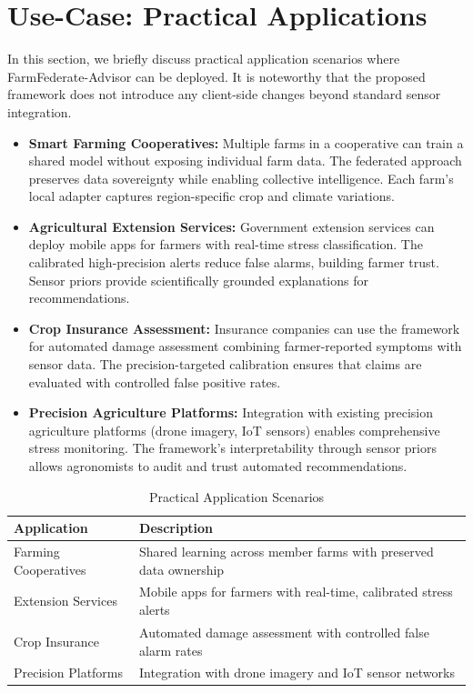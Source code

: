 \documentclass[10pt,journal,compsoc]{IEEEtran}
\begin{document}
\section{Use-Case: Practical Applications}
\label{sec:usecase}

In this section, we briefly discuss practical application scenarios where FarmFederate-Advisor can be deployed. It is noteworthy that the proposed framework does not introduce any client-side changes beyond standard sensor integration.

\begin{itemize}
    \item \textbf{Smart Farming Cooperatives:} Multiple farms in a cooperative can train a shared model without exposing individual farm data. The federated approach preserves data sovereignty while enabling collective intelligence. Each farm's local adapter captures region-specific crop and climate variations.

    \item \textbf{Agricultural Extension Services:} Government extension services can deploy mobile apps for farmers with real-time stress classification. The calibrated high-precision alerts reduce false alarms, building farmer trust. Sensor priors provide scientifically grounded explanations for recommendations.

    \item \textbf{Crop Insurance Assessment:} Insurance companies can use the framework for automated damage assessment combining farmer-reported symptoms with sensor data. The precision-targeted calibration ensures that claims are evaluated with controlled false positive rates.

    \item \textbf{Precision Agriculture Platforms:} Integration with existing precision agriculture platforms (drone imagery, IoT sensors) enables comprehensive stress monitoring. The framework's interpretability through sensor priors allows agronomists to audit and trust automated recommendations.
\end{itemize}

\begin{table}[!t]
\centering
\caption{Practical Application Scenarios}
\label{tab:usecases}
\small
\begin{tabular}{p{2.2cm}p{5.3cm}}
\toprule
\textbf{Application} & \textbf{Description} \\
\midrule
Farming Cooperatives & Shared learning across member farms with preserved data ownership \\
\midrule
Extension Services & Mobile apps for farmers with real-time, calibrated stress alerts \\
\midrule
Crop Insurance & Automated damage assessment with controlled false alarm rates \\
\midrule
Precision Platforms & Integration with drone imagery and IoT sensor networks \\
\bottomrule
\end{tabular}
\end{table}
\end{document}
